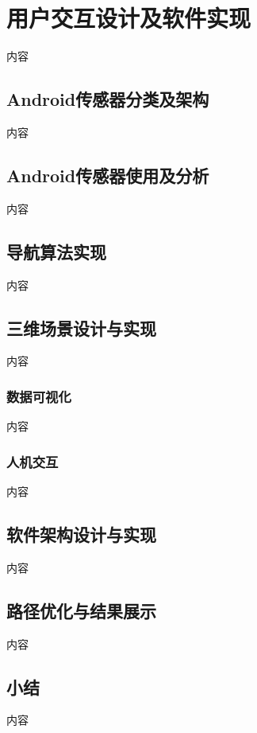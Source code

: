 \section{用户交互设计及软件实现}
        内容
        \subsection{Android传感器分类及架构}
            内容
        \subsection{Android传感器使用及分析}
            内容
        \subsection{导航算法实现}
            内容
        \subsection{三维场景设计与实现}
            内容
            \subsubsection{数据可视化}
                内容
            \subsubsection{人机交互}
                内容
        \subsection{软件架构设计与实现}
            内容
        \subsection{路径优化与结果展示}
            内容
        \subsection{小结}
            内容
